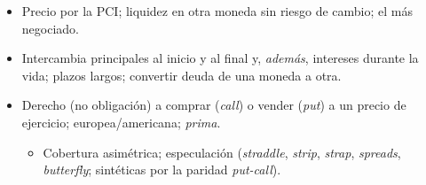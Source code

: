 \documentclass{article}
\begin{document}
\begin{columnas}
\begin{itemize}
  \begin{itemize}
  \item Precio por la PCI; liquidez en otra moneda sin riesgo de cambio; el más negociado.
  \end{itemize}
\end{itemize}
\begin{itemize}
\item Intercambia principales al inicio y al final y, \emph{además}, intereses durante la vida; plazos largos; convertir deuda de una moneda a otra.
\end{itemize}
\begin{itemize}
\item Derecho (no obligación) a comprar (\emph{call}) o vender (\emph{put}) a un precio de ejercicio; europea/americana; \emph{prima}.
  \begin{itemize}
  \item Cobertura asimétrica; especulación (\emph{straddle}, \emph{strip}, \emph{strap}, \emph{spreads}, \emph{butterfly}; sintéticas por la paridad \emph{put-call}).
  \end{itemize}
\end{itemize}


\end{columnas}
\end{document}

